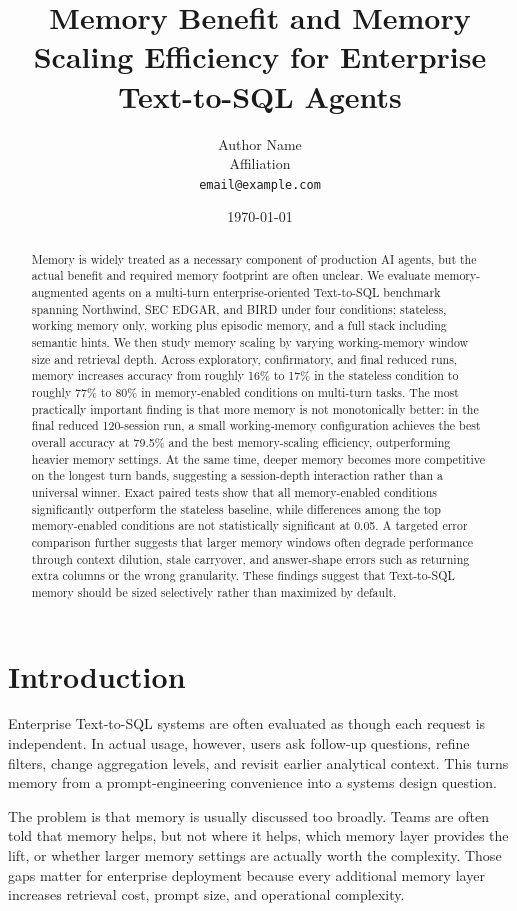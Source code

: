 \documentclass[11pt]{article}
\title{Memory Benefit and Memory Scaling Efficiency for Enterprise Text-to-SQL Agents}
\author{
  Author Name \\
  Affiliation \\
  \texttt{email@example.com}
}
\date{\today}
\begin{document}
\maketitle

\begin{abstract}
Memory is widely treated as a necessary component of production AI agents, but the actual benefit and required memory footprint are often unclear. We evaluate memory-augmented agents on a multi-turn enterprise-oriented Text-to-SQL benchmark spanning Northwind, SEC EDGAR, and BIRD under four conditions: stateless, working memory only, working plus episodic memory, and a full stack including semantic hints. We then study memory scaling by varying working-memory window size and retrieval depth. Across exploratory, confirmatory, and final reduced runs, memory increases accuracy from roughly 16\% to 17\% in the stateless condition to roughly 77\% to 80\% in memory-enabled conditions on multi-turn tasks. The most practically important finding is that more memory is not monotonically better: in the final reduced 120-session run, a small working-memory configuration achieves the best overall accuracy at 79.5\% and the best memory-scaling efficiency, outperforming heavier memory settings. At the same time, deeper memory becomes more competitive on the longest turn bands, suggesting a session-depth interaction rather than a universal winner. Exact paired tests show that all memory-enabled conditions significantly outperform the stateless baseline, while differences among the top memory-enabled conditions are not statistically significant at 0.05. A targeted error comparison further suggests that larger memory windows often degrade performance through context dilution, stale carryover, and answer-shape errors such as returning extra columns or the wrong granularity. These findings suggest that Text-to-SQL memory should be sized selectively rather than maximized by default.
\end{abstract}

\section{Introduction}
Enterprise Text-to-SQL systems are often evaluated as though each request is independent. In actual usage, however, users ask follow-up questions, refine filters, change aggregation levels, and revisit earlier analytical context. This turns memory from a prompt-engineering convenience into a systems design question.

The problem is that memory is usually discussed too broadly. Teams are often told that memory helps, but not where it helps, which memory layer provides the lift, or whether larger memory settings are actually worth the complexity. Those gaps matter for enterprise deployment because every additional memory layer increases retrieval cost, prompt size, and operational complexity.
\end{document}
